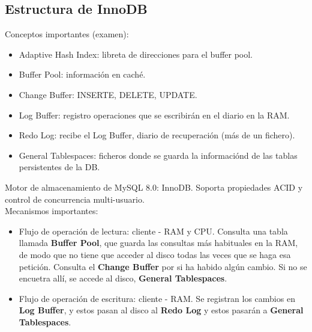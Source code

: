 \documentclass{article}
\begin{document}
\subsection{Estructura de InnoDB}
Conceptos importantes (examen):
\begin{itemize}
	\item Adaptive Hash Index: libreta de direcciones para el buffer pool.
	\item Buffer Pool: información en caché.
	\item Change Buffer: INSERTE, DELETE, UPDATE.
	\item Log Buffer: registro operaciones que se escribirán en el diario en la RAM.
	\item Redo Log: recibe el Log Buffer, diario de recuperación (más de un fichero).
	\item General Tablespaces: ficheros donde se guarda la informaciónd de las tablas persistentes de la DB.
\end{itemize}
Motor de almacenamiento de MySQL 8.0: InnoDB. Soporta propiedades ACID y control de concurrencia multi-usuario.\\
Mecanismos importantes:
\begin{itemize}
	\item Flujo de operación de lectura: cliente - RAM y CPU. Consulta una tabla llamada \textbf{Buffer Pool}, que guarda las consultas más habituales en la RAM, de modo que no tiene que acceder al disco todas las veces que se haga esa petición. Consulta el \textbf{Change Buffer} por si ha habido algún cambio. Si no se encuetra allí, se accede al disco, \textbf{General Tablespaces}.
	\item Flujo de operación de escritura: cliente - RAM. Se registran los cambios en \textbf{Log Buffer}, y estos pasan al disco al \textbf{Redo Log} y estos pasarán a \textbf{General Tablespaces}.
\end{itemize}
\end{document}
